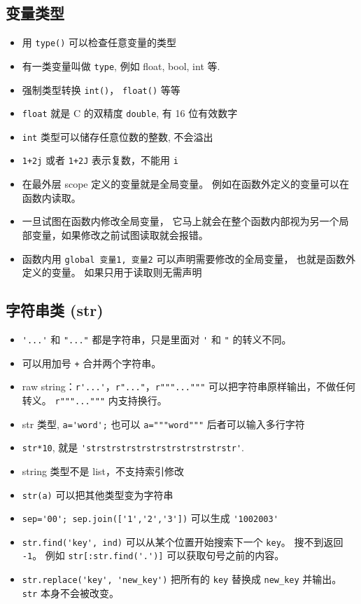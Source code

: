 \subsection{变量类型}
\begin{itemize}
\item 用 \verb`type()` 可以检查任意变量的类型
\item 有一类变量叫做 \verb`type`, 例如 float, bool, int 等.
\item 强制类型转换 \verb`int()`， \verb`float()` 等等
\item \verb`float` 就是 C 的双精度 \verb`double`, 有 16 位有效数字
\item \verb`int` 类型可以储存任意位数的整数, 不会溢出
\item \verb`1+2j` 或者 \verb`1+2J` 表示复数，不能用 \verb`i`
\item 在最外层 scope 定义的变量就是全局变量。 例如在函数外定义的变量可以在函数内读取。
\item 一旦试图在函数内修改全局变量， 它马上就会在整个函数内部视为另一个局部变量，如果修改之前试图读取就会报错。
\item 函数内用 \verb`global 变量1, 变量2` 可以声明需要修改的全局变量， 也就是函数外定义的变量。 如果只用于读取则无需声明
\end{itemize}

\subsection{字符串类 (str)}
\begin{itemize}
\item \verb`'...'` 和 \verb`"..."` 都是字符串，只是里面对 \verb`'` 和 \verb`"` 的转义不同。
\item 可以用加号 \verb`+` 合并两个字符串。
\item raw string：\verb`r'...'`，\verb`r"..."`，\verb`r"""..."""` 可以把字符串原样输出，不做任何转义。 \verb`r"""..."""` 内支持换行。
\item str 类型, \verb`a='word';` 也可以 \verb`a="""word"""` 后者可以输入多行字符
\item \verb`str*10`, 就是 \verb`'strstrstrstrstrstrstrstrstrstr'`.
\item string 类型不是 list，不支持索引修改
\item \verb`str(a)` 可以把其他类型变为字符串
\item \verb`sep='00'; sep.join(['1','2','3'])` 可以生成 \verb`'1002003'`
\item \verb`str.find('key', ind)` 可以从某个位置开始搜索下一个 \verb`key`。 搜不到返回 \verb`-1`。 例如 \verb`str[:str.find('.')]` 可以获取句号之前的内容。
\item \verb`str.replace('key', 'new_key')` 把所有的 \verb`key` 替换成 \verb`new_key` 并输出。 \verb`str` 本身不会被改变。
\end{itemize}

